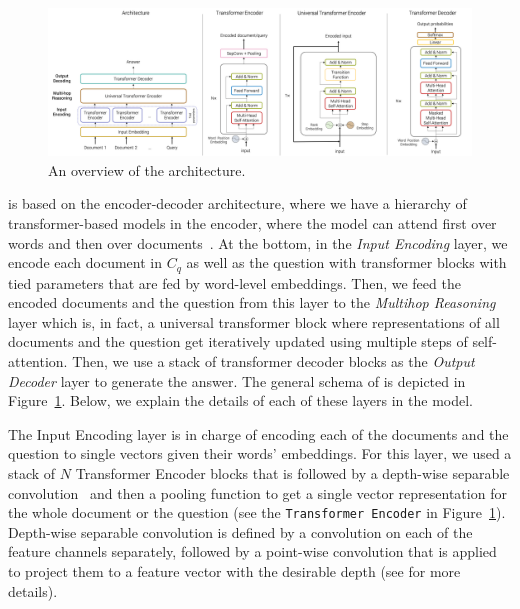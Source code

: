 \begin{figure}[!t]
 \centering
 \includegraphics[width=\textwidth]{04-part-03/chapter-06/figs_and_tables/fig_tracrnet.png}
 \caption{An overview of the \tracrnet architecture.}
 \label{fig:model_tracrnet}
\end{figure}

\tracrnet is based on the encoder-decoder architecture, where we have a hierarchy of transformer-based models in the encoder, where the model can attend first over words and then over documents~\citep{Dehghani2017:CIKM}. At the bottom, in the \emph{Input Encoding} layer, we encode each document in $C_q$ as well as the question with transformer blocks with tied parameters that are fed by word-level embeddings. 
Then, we feed the encoded documents and the question from this layer to the \emph{Multihop Reasoning} layer which is, in fact, a universal transformer block where representations of all documents and the question get iteratively updated using multiple steps of self-attention.
Then, we use a stack of transformer decoder blocks as the \emph{Output Decoder} layer to generate the answer. 
%
The general schema of \tracrnet is depicted in Figure~\ref{fig:model_tracrnet}. 
Below, we explain the details of each of these layers in the model.

The Input Encoding layer is in charge of encoding each of the documents and the question to single vectors given their words' embeddings. For this layer, we used a stack of $N$ Transformer Encoder blocks that is followed by a depth-wise separable convolution~\citep{kaiser2017depthwise,chollet2017xception} and then a pooling function to get a single vector representation for the whole document or the question  (see the \texttt{Transformer Encoder} in Figure~\ref{fig:model_tracrnet}). 
Depth-wise separable convolution is defined by a convolution on each of the feature channels separately, followed by a point-wise convolution that is applied to project them to a feature vector with the desirable depth (see \citep{chollet2017xception} for more details).

